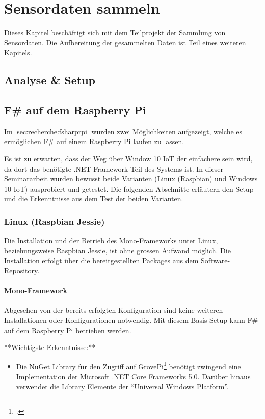 
\chapter{Sensordaten sammeln}
Dieses Kapitel beschäftigt sich mit dem Teilprojekt der Sammlung von Sensordaten. Die Aufbereitung der gesammelten Daten ist Teil eines weiteren Kapitels.


\section{Analyse \& Setup}
\section{F\# auf dem Raspberry Pi}
Im \cref{sec:recherche:fsharprpi}  wurden zwei Möglichkeiten aufgezeigt, welche es ermöglichen F\# auf einem Raspberry Pi laufen zu lassen.

Es ist zu erwarten, dass der Weg über Window 10 IoT der einfachere sein wird, da dort das benötigte .NET Framework Teil des Systems ist. In dieser Seminararbeit wurden bewusst beide Varianten (Linux (Raspbian) und Windows 10 IoT) ausprobiert und getestet. Die folgenden Abschnitte erläutern den Setup und die Erkenntnisse aus dem Test der beiden Varianten. 

\subsection{Linux (Raspbian Jessie)}
Die Installation und der Betrieb des Mono-Frameworks unter Linux, beziehungsweise Raspbian Jessie, ist ohne grossen Aufwand möglich. Die Installation erfolgt über die bereitgestellten Packages aus dem Software-Repository.


\subsubsection{Mono-Framework}
Abgesehen von der bereits erfolgten Konfiguration sind keine weiteren Installationen oder Konfigurationen notwendig. Mit diesem Basis-Setup kann F\# auf dem Raspberry Pi betrieben werden.

**Wichtigste Erkenntnisse:**
\begin{itemize}
\item Die NuGet Library für den Zugriff auf GrovePi\footcite{NuGet_GrovePi_2016-04-24} benötigt zwingend eine Implementation der Microsoft .NET Core Frameworks 5.0. Darüber hinaus verwendet die Library Elemente der "`Universal Windows Platform"'.
\end{itemize}

